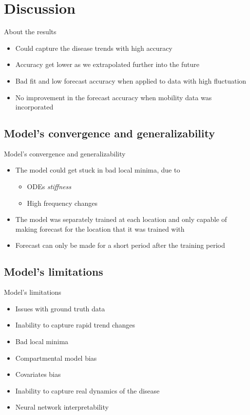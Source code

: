 \section{Discussion}

\begin{frame}{About the results}
    \begin{itemize}
        \item Could capture the disease trends with high accuracy
        \item Accuracy get lower as we extrapolated further into the future
        \item Bad fit and low forecast accuracy when applied to data with high fluctuation
        \item No improvement in the forecast accuracy when mobility data was incorporated
    \end{itemize}
\end{frame}

\subsection{Model's convergence and generalizability}

\begin{frame}{Model's convergence and generalizability}
    \begin{itemize}
        \item The model could get stuck in bad local minima, due to
        \begin{itemize}
            \item \glspl{ODE} \textit{stiffness}
            \item High frequency changes
        \end{itemize}
        \item The model was separately trained at each location and only capable of making forecast for the location that it was trained with
        \item Forecast can only be made for a short period after the training period
    \end{itemize}
\end{frame}

\subsection{Model's limitations}

\begin{frame}{Model's limitations}
    \begin{itemize}
        \item Issues with ground truth data
        \item Inability to capture rapid trend changes
        \item Bad local minima
        \item Compartmental model bias
        \item Covariates bias
        \item Inability to capture real dynamics of the disease
        \item Neural network interpretability
    \end{itemize}
\end{frame}